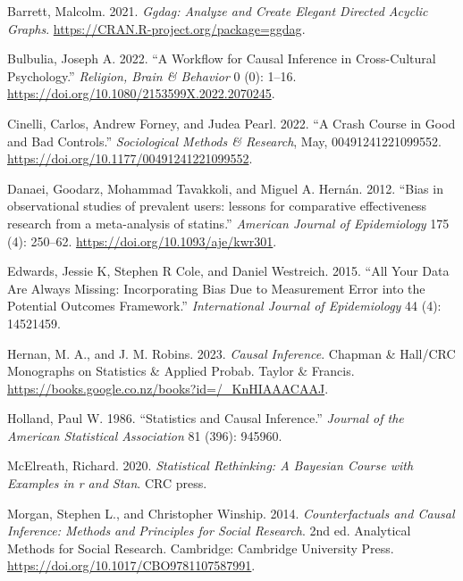 \documentclass[
  singlecolumn]{report}
\newlength{\cslhangindent}
\newlength{\cslentryspacingunit} %
\newenvironment{CSLReferences}[2] %
 {%
  \setlength{\parindent}{0pt}
  \ifodd #1
  \let\oldpar\par
  \def\par{\hangindent=\cslhangindent\oldpar}
  \fi
  \setlength{\parskip}{#2\cslentryspacingunit}
 }%
 {}
\begin{document}
\hypertarget{refs}{}
\begin{CSLReferences}{1}{0}
\leavevmode{}%
Barrett, Malcolm. 2021. \emph{Ggdag: Analyze and Create Elegant Directed
Acyclic Graphs}. \url{https://CRAN.R-project.org/package=ggdag}.

\leavevmode{}%
Bulbulia, Joseph A. 2022. {``A Workflow for Causal Inference in
Cross-Cultural Psychology.''} \emph{Religion, Brain \& Behavior} 0 (0):
1--16. \url{https://doi.org/10.1080/2153599X.2022.2070245}.

\leavevmode{}%
Cinelli, Carlos, Andrew Forney, and Judea Pearl. 2022. {``A Crash Course
in Good and Bad Controls.''} \emph{Sociological Methods \& Research},
May, 00491241221099552. \url{https://doi.org/10.1177/00491241221099552}.

\leavevmode{}%
Danaei, Goodarz, Mohammad Tavakkoli, and Miguel A. Hernán. 2012. {``Bias
in observational studies of prevalent users: lessons for comparative
effectiveness research from a meta-analysis of statins.''}
\emph{American Journal of Epidemiology} 175 (4): 250--62.
\url{https://doi.org/10.1093/aje/kwr301}.

\leavevmode{}%
Edwards, Jessie K, Stephen R Cole, and Daniel Westreich. 2015. {``All
Your Data Are Always Missing: Incorporating Bias Due to Measurement
Error into the Potential Outcomes Framework.''} \emph{International
Journal of Epidemiology} 44 (4): 14521459.

\leavevmode{}%
Hernan, M. A., and J. M. Robins. 2023. \emph{Causal Inference}. Chapman
\& Hall/CRC Monographs on Statistics \& Applied Probab. Taylor \&
Francis. \url{https://books.google.co.nz/books?id=/_KnHIAAACAAJ}.

\leavevmode{}%
Holland, Paul W. 1986. {``Statistics and Causal Inference.''}
\emph{Journal of the American Statistical Association} 81 (396): 945960.

\leavevmode{}%
McElreath, Richard. 2020. \emph{Statistical Rethinking: A Bayesian
Course with Examples in r and Stan}. CRC press.

\leavevmode{}%
Morgan, Stephen L., and Christopher Winship. 2014. \emph{Counterfactuals
and Causal Inference: Methods and Principles for Social Research}. 2nd
ed. Analytical Methods for Social Research. Cambridge: Cambridge
University Press. \url{https://doi.org/10.1017/CBO9781107587991}.


\end{CSLReferences}
\end{document}
